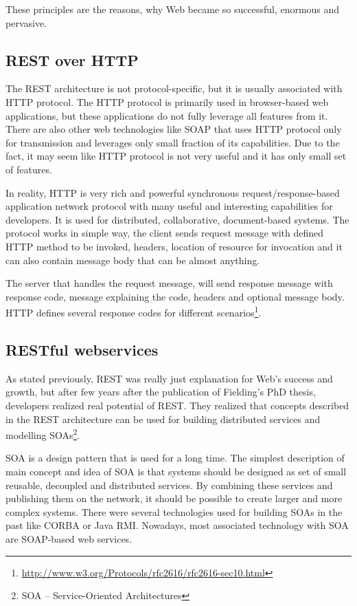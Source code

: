 \documentclass[12pt,final,oneside]{fithesis2}
\begin{document}
These principles are the reasons, why Web became so successful, enormous and pervasive.\cite{resteasy-book}

\subsection{REST over HTTP}
The REST architecture is not protocol-specific, but it is usually associated with HTTP protocol. The HTTP protocol is primarily used in browser-based web applications, but these applications do not fully leverage all features from it. There are also other web technologies like SOAP that uses HTTP protocol only for transmission and leverages only small fraction of its capabilities. Due to the fact, it may seem like HTTP protocol is not very useful and it has only small set of features. 

In reality, HTTP is very rich and powerful synchronous request/response-based application network protocol with many useful and interesting capabilities for developers. It is used for distributed, collaborative, document-based systems. The protocol works in simple way, the client sends request message with defined HTTP method to be invoked, headers, location of resource for invocation and it can also contain message body that can be almost anything.

The server that handles the request message, will send response message with response code, message explaining the code, headers and optional message body. HTTP defines several response codes for different scenarios\footnote{\url{http://www.w3.org/Protocols/rfc2616/rfc2616-sec10.html}}.\cite{resteasy-book}

\subsection{RESTful webservices}
As stated previously, REST was really just explanation for Web's success and growth, but after few years after the publication of Fielding's PhD thesis, developers realized real potential of REST. They realized that concepts described in the REST architecture can be used for building distributed services and modelling SOAs\footnote{SOA -- Service-Oriented Architectures}. 

SOA is a design pattern that is used for a long time. The simplest description of main concept and idea of SOA is that systems should be designed as set of small reusable, decoupled and distributed services. By combining these services and publishing them on the network, it should be possible to create larger and more complex systems. There were several technologies used for building SOAs in the past like CORBA or Java RMI. Nowadays, most associated technology with SOA are SOAP-based web services.  
\end{document}
